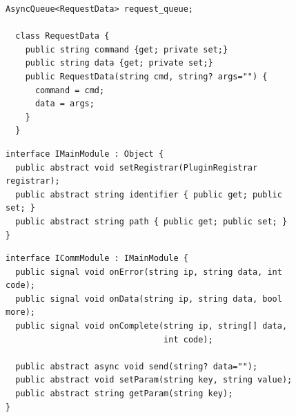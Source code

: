\begin{figure}[H]
 \lstset{language=[ISO]C++}
 \begin{lstlisting}[label=alg:praxis-basis-kernel-msg,caption={[Asynchrone MessageQueue und Datentyp RequestData]Die asynchrone Queue, typisiert auf \texttt{RequestData}, beinhaltet alle Nachrichten\index{Nachricht}, welche nacheinander abgearbeitet werden. Die Nachrichten werden durch die Klasse \texttt{RequestData} definiert, wobei das Kommando immer angegeben werden muss, die Daten sind jedoch optional.\index{MessageQueue}\index{RequestData}}]
  AsyncQueue<RequestData> request_queue;

  class RequestData {
    public string command {get; private set;}
    public string data {get; private set;}
    public RequestData(string cmd, string? args="") {
      command = cmd;
      data = args;
    }
  }
 \end{lstlisting}
\end{figure}

\begin{figure}[H]
 \lstset{language=[ISO]C++}
 \begin{lstlisting}[label=alg:praxis-basis-imainmodule,caption={[Interface: IMainModule]Das Haupt-Interface von Plugins beinhaltet nur Methoden zur Registrierung des Modul-Containers sowie Properties f\"ur den Identifier und den Pfad, welche in der Einstiegsfunktion des Plugins schon definiert sind.}]
interface IMainModule : Object {
  public abstract void setRegistrar(PluginRegistrar registrar);
  public abstract string identifier { public get; public set; }
  public abstract string path { public get; public set; }
}
 \end{lstlisting}
\end{figure}

\begin{figure}[H]
 \lstset{language=[ISO]C++}
 \begin{lstlisting}[label=alg:praxis-basis-icommodule,caption={[Interface: ICommModule]Das Interface eines Netzwerk- und BUS-Modules. Die Signale \texttt{onError}, \texttt{onData} und \texttt{onComplete} k\"onnen auf mehrere unterschiedliche Empf\"anger gebunden werden.}]
interface ICommModule : IMainModule {
  public signal void onError(string ip, string data, int code);
  public signal void onData(string ip, string data, bool more);
  public signal void onComplete(string ip, string[] data,
                                int code);

  public abstract async void send(string? data="");
  public abstract void setParam(string key, string value);
  public abstract string getParam(string key);
}
 \end{lstlisting}
\end{figure}

